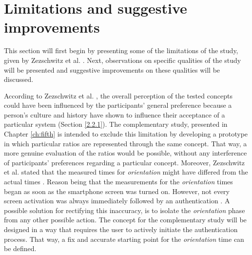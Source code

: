 \section{Limitations and suggestive improvements} \label{3.3}

This section will first begin by presenting some of the limitations of the study, given by Zezschwitz et al. \cite{Zezschwitz}. Next, observations on specific qualities of the study will be presented and suggestive improvements on these qualities will be discussed. 

According to Zezschwitz et al. \cite{Zezschwitz}, the overall perception of the tested concepts could have been influenced by the participants' general preference \cite{Zezschwitz} because a person's culture and history have shown to influence their acceptance of a particular system \cite{Harbach:2016} (Section \ref{2.2.1}). The complementary study, presented in Chapter \ref{ch:fifth} is intended to exclude this limitation by developing a prototype in which particular ratios are represented through the same concept. That way, a more genuine evaluation of the ratios would be possible, without any interference of participants' preferences regarding a particular concept. Moreover, Zezschwitz et al. \cite{Zezschwitz} stated that the measured times for \textit{orientation} might have differed from the actual times \cite{Zezschwitz}. Reason being that the measurements for the \textit{orientation} times began as soon as the smartphone screen was turned on. However, not every screen activation was always immediately followed by an authentication \cite{Zezschwitz}. A possible solution for rectifying this inaccuracy, is to isolate the \textit{orientation} phase from any other possible action. The concept for the complementary study will be designed in a way that requires the user to actively initiate the authentication process. That way, a fix and accurate starting point for the \textit{orientation} time can be defined.\\

